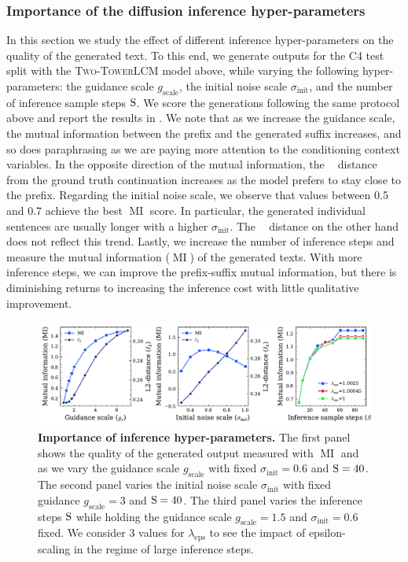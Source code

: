 \documentclass[twoside,11pt]{fairmeta}
\newcommand{\lcm}{\textsc{LCM}\xspace}
\newcommand{\twotower}{\textsc{Two-Tower}\xspace}
\newcommand{\sigmainit}{\sigma_\text{init}}
\newcommand{\guidance}{g_\text{scale}}
\newcommand{\epscaling}{\lambda_\text{eps}}
\DeclareMathOperator{\ltwo}{\ell_2}
\DeclareMathOperator{\mutinfo}{MI}
\newcommand{\cfour}{\textsc{C4}\xspace}
\def\rS{{\textnormal{S}}}
\begin{document}
\subsubsection{Importance of the diffusion inference hyper-parameters}
In this section we study the effect of different inference hyper-parameters on the quality of the generated text. To this end, we generate outputs for the \cfour test split with the \twotower \lcm model above, while varying the following hyper-parameters: the guidance scale $\guidance$, the initial noise scale $\sigmainit$, and the number of inference sample steps $\rS$. We score the generations following the same protocol above and report the results in . We note that as we increase the guidance scale, the mutual information between the prefix and the generated suffix increases, and so does paraphrasing as we are paying more attention to the conditioning context variables. In the opposite direction of the mutual information, the $\ltwo$ distance from the ground truth continuation increases as the model prefers to stay close to the prefix.   Regarding the initial noise scale, we observe that values between 0.5 and 0.7 achieve the best $\mutinfo$ score. In particular, the generated individual sentences are usually longer with a higher $\sigmainit$. The $\ltwo$ distance on the other hand does not reflect this trend. Lastly, we increase the number of inference steps and measure the mutual information ($\mutinfo$) of the generated texts. With more inference steps, we can improve the prefix-suffix mutual information, but there is diminishing returns to increasing the inference cost with little qualitative improvement.

\begin{figure}
\centering
\includegraphics[width=\linewidth]{figures/lineplots/inference_analysis.pdf}
\caption{\textbf{Importance of inference hyper-parameters.} The first panel shows the quality of the generated output measured with $\mutinfo$ and $\ltwo$ as we vary the guidance scale $\guidance$ with fixed $\sigmainit=0.6$ and $\rS=40$. The second panel varies the initial noise scale $\sigmainit$ with fixed guidance $\guidance=3$ and $\rS=40$. The third panel varies the inference steps $\rS$ while holding the guidance scale $\guidance=1.5$ and $\sigmainit=0.6$ fixed. We consider 3 values for $\epscaling$ to see the impact of epsilon-scaling in the regime of large inference steps.}
\label{fig:arch:ablation:inference}
\end{figure}
\end{document}
